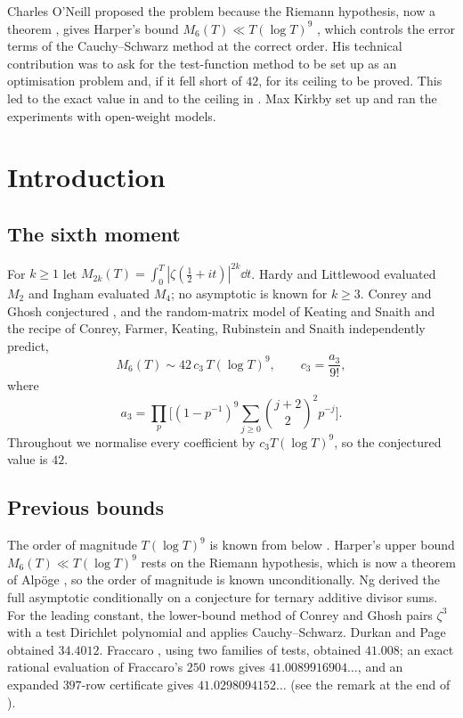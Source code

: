 \documentclass[11pt,colorlinks]{charlie}
\begin{document}
Charles O'Neill proposed the problem because the Riemann hypothesis, now a theorem \cite{Alpoge}, gives Harper's bound $M_6(T)\ll T(\log T)^9$ \cite{Harper}, which controls the error terms of the Cauchy--Schwarz method at the correct order. His technical contribution was to ask for the test-function method to be set up as an optimisation problem and, if it fell short of $42$, for its ceiling to be proved. This led to the exact value in  and to the ceiling in . Max Kirkby set up and ran the experiments with open-weight models. \responsibilitystatement

\section{Introduction}

\subsection{The sixth moment}
For $k\ge1$ let $M_{2k}(T)=\int_0^T|\zeta(\tfrac12+it)|^{2k}\dd t$. Hardy and Littlewood evaluated $M_2$ and Ingham evaluated $M_4$; no asymptotic is known for $k\ge3$. Conrey and Ghosh conjectured \cite{CG}, and the random-matrix model of Keating and Snaith \cite{KS} and the recipe of Conrey, Farmer, Keating, Rubinstein and Snaith \cite{CFKRS} independently predict,
\begin{equation}\label{eq:conj}
 M_6(T)\sim 42\,c_3\,T(\log T)^9,\qquad
 c_3=\frac{a_3}{9!},
\end{equation}
where
\[
 a_3=\prod_p\Big[(1-p^{-1})^9\sum_{j\ge0}\binom{j+2}{2}^{2}p^{-j}\Big].
\]
Throughout we normalise every coefficient by $c_3T(\log T)^9$, so the conjectured value is $42$.

\subsection{Previous bounds}
The order of magnitude $T(\log T)^9$ is known from below \cite{RS,HS}. Harper's upper bound $M_6(T)\ll T(\log T)^9$ \cite{Harper} rests on the Riemann hypothesis, which is now a theorem of Alp\"oge \cite{Alpoge}, so the order of magnitude is known unconditionally. Ng \cite{Ng} derived the full asymptotic conditionally on a conjecture for ternary additive divisor sums. For the leading constant, the lower-bound method of Conrey and Ghosh pairs $\zeta^3$ with a test Dirichlet polynomial and applies Cauchy--Schwarz. Durkan and Page \cite{DP} obtained $34.4012$. Fraccaro \cite{Fraccaro}, using two families of tests, obtained $41.008$; an exact rational evaluation of Fraccaro's $250$ rows gives $41.0089916904\ldots$, and an expanded $397$-row certificate gives $41.0298094152\ldots$ (see the remark at the end of ).
\end{document}
